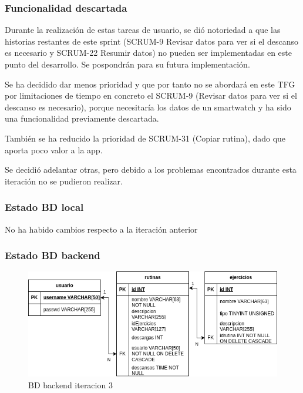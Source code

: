 
\subsubsection{Funcionalidad descartada}

Durante la realización de estas tareas de usuario, se dió notoriedad a que las historias restantes de este sprint (SCRUM-9 Revisar datos para ver si el descanso es necesario y SCRUM-22 Resumir datos) no pueden ser implementadas en este punto del desarrollo. Se pospondrán para su futura implementación.

Se ha decidido dar menos prioridad y que por tanto no se abordará en este TFG por limitaciones de tiempo en concreto el SCRUM-9 (Revisar datos para ver si el descanso es necesario), porque necesitaría los datos de un smartwatch y ha sido una funcionalidad previamente descartada.

También se ha reducido la prioridad de SCRUM-31 (Copiar rutina), dado que aporta poco valor a la app.

Se decidió adelantar otras, pero debido a los problemas encontrados durante esta iteración no se pudieron realizar.

\subsubsection{Estado BD local}

No ha habido cambios respecto a la iteración anterior

\subsubsection{Estado BD backend}

\begin{figure}[H]
   \centering
    \includegraphics[width=\textwidth]{fotos/BD be iteracion 3.png}
    \caption{BD backend iteracion 3}
    \label{fig:BD be iteracion 3}
\end{figure}

